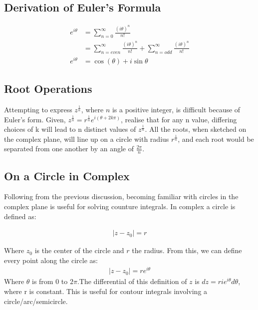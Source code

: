 \documentclass[12pt]{article}
\begin{document}
\subsection{Derivation of Euler's Formula}
\begin{equation}
    \begin{aligned}
	    e^{i \theta} &= \sum_{n=0}^{\infty}{\frac{(i \theta)^n}{n!}}\\
			 &= \sum_{n=even}^{\infty}{\frac{(i \theta)^n}{n!}} + \sum_{n=odd}^{\infty}{\frac{(i \theta)^n}{n!}}\\
	    e^{i \theta} &= \cos(\theta) + i\sin{\theta}
    \end{aligned}
\end{equation}

\subsection{Root Operations}
Attempting to express $z^{\frac{1}{n}}$, where $n$ is a positive integer, is difficult because of Euler's form. Given, $z^{\frac{1}{n}} = r^{\frac{1}{n}}e^{i(\theta +2k \pi)}$, realise that for any n value, differing choices of k will lead to n distinct values of $z^{\frac{1}{n}}$. All the roots, when sketched on the complex plane, will line up on a circle with radius $r^{\frac{1}{n}}$, and each root would be separated from one another by an angle of $\frac{2\pi}{n}$.

\subsection{On a Circle in Complex}
Following from the previous discussion, becoming familiar with circles in the complex plane is useful for solving counture integrals. In complex a circle is defined as: 

\begin{equation}
    \begin{aligned}
	    |z-z_0| = r
    \end{aligned}
\end{equation}

Where $z_0$ is the center of the circle and $r$ the radius. From this, we can define every point along the circle as:
\begin{equation}
    \begin{aligned}
	    |z-z_0| = re^{i \theta}
    \end{aligned}
\end{equation}
Where $\theta$ is from $0$ to $2\pi$.The differential of this definition of $z$ is $dz = rie^{i \theta}d \theta$, where r is constant. This is useful for contour integrals involving a circle/arc/semicircle.  
\end{document}
